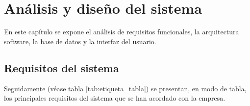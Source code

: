 \chapter{Análisis y diseño del sistema}

En este capítulo se expone el análisis de requisitos funcionales, la arquitectura software, la base de datos y la interfaz del usuario.

\section{Requisitos del sistema}
\label{section-requisitos}

Seguidamente (véase tabla \ref{tab:etiqueta_tabla}) se presentan, en modo de tabla, los principales requisitos del sistema que se han acordado con la empresa.


